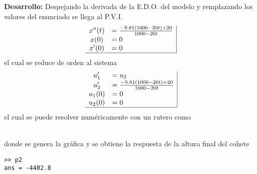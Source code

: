 \documentclass[letter,11pt]{article}
\begin{document}
\textbf{Desarrollo:} Despejando la derivada de la E.D.O. del modelo y remplazando los valores del enunciado se llega al P.V.I.
$$
\begin{array}{cl|}
     x''(t)&=\frac{-9.81(1000-20t)+20}{1000-20t}  \\
     x(0)   &=0\\
     x'(0)   &=0\\\hline
\end{array}
$$
el cual se reduce de orden al sistema
$$
\begin{array}{cl|}
     u_1'&=u_2\\
     u_2'&=\frac{-9.81(1000-20t)+20}{1000-20t}  \\
     u_1(0)   &=0\\
     u_2(0)   &=0\\\hline
\end{array}
$$
el cual se puede resolver num\'ericamente con un rutero como

\hfill{}\\
donde se genera la gr\'afica
y se obtiene la respuesta de la altura final del cohete
\begin{lstlisting}
>> p2
ans = -4402.8

\end{lstlisting}
    \hfill{}\\
\end{document}

